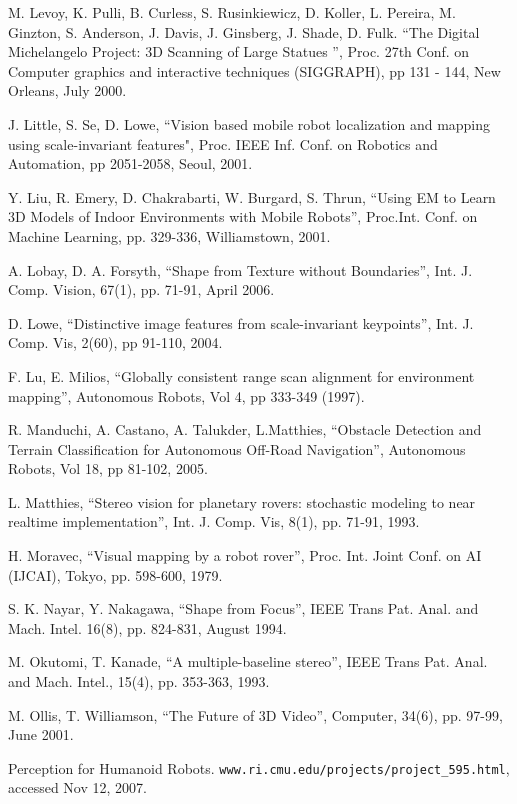 \documentclass[twocolumn,oneside]{book}
\begin{document}
\begin{thebibliography}{99}
M. Levoy, K. Pulli, B. Curless, S. Rusinkiewicz, D. Koller, L. Pereira, M. Ginzton, S. Anderson, J. Davis, J. Ginsberg, J. Shade, D. Fulk.
``The Digital Michelangelo Project: 3D Scanning of Large Statues '',
Proc. 27th Conf. on Computer graphics and interactive techniques
(SIGGRAPH), pp 131 - 144, New Orleans, July 2000.

J. Little, S. Se, D. Lowe,
``Vision based mobile robot localization and mapping using scale-invariant features",
Proc. IEEE Inf. Conf. on Robotics and Automation, pp 2051-2058, Seoul, 2001.

Y. Liu, R. Emery, D. Chakrabarti, W. Burgard, S. Thrun, 
``Using EM to Learn 3D Models of Indoor Environments with Mobile
Robots'', 
Proc.Int. Conf. on Machine Learning, pp. 329-336, Williamstown, 2001.

A. Lobay, D. A. Forsyth, 
``Shape from Texture without Boundaries'',
Int. J. Comp. Vision, 67(1), pp. 71-91, April 2006.

D. Lowe, 
``Distinctive image features from scale-invariant keypoints'',
Int. J. Comp. Vis, 2(60), pp 91-110, 2004.

F. Lu, E. Milios,
``Globally consistent range scan alignment for environment mapping'',
Autonomous Robots, Vol 4, pp 333-349 (1997).

R. Manduchi, A. Castano, A. Talukder, L.Matthies,
``Obstacle Detection and Terrain Classification for Autonomous Off-Road Navigation'',
Autonomous Robots, Vol 18, pp 81-102, 2005.

L. Matthies,
``Stereo vision for planetary rovers: stochastic
modeling to near realtime implementation'',
Int. J. Comp. Vis,  8(1), pp. 71-91, 1993.

H. Moravec, 
``Visual mapping by a robot rover'',
Proc. Int. Joint Conf. on AI (IJCAI), Tokyo, pp. 598-600, 1979.

S. K. Nayar, Y. Nakagawa, 
``Shape from Focus'',
IEEE Trans Pat. Anal. and Mach. Intel. 16(8), pp. 824-831, August 1994.

M. Okutomi, T. Kanade,
``A multiple-baseline stereo'',
IEEE Trans Pat. Anal. and Mach. Intel., 15(4), pp. 353-363, 1993.

M. Ollis, T. Williamson,
``The Future of 3D Video'', Computer, 34(6), pp. 97-99, June 2001.

Perception for Humanoid Robots.
\verb+www.ri.cmu.edu/projects/project_595.html+, accessed Nov 12, 2007.


\end{thebibliography}
\end{document}
